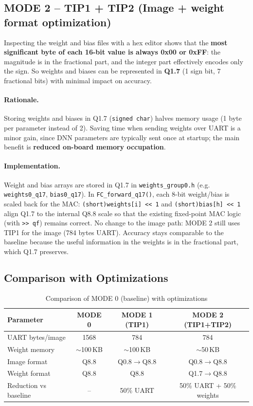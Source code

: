 \documentclass[11pt,a4paper]{article}
\begin{document}
\subsection{MODE 2 -- TIP1 + TIP2 (Image + weight format optimization)}

Inspecting the weight and bias files with a hex editor shows that the \textbf{most significant byte of each 16-bit value is always 0x00 or 0xFF}: the magnitude is in the fractional part, and the integer part effectively encodes only the sign. So weights and biases can be represented in \textbf{Q1.7} (1 sign bit, 7 fractional bits) with minimal impact on accuracy.

\paragraph{Rationale.} Storing weights and biases in Q1.7 (\texttt{signed char}) halves memory usage (1 byte per parameter instead of 2). Saving time when sending weights over UART is a minor gain, since DNN parameters are typically sent once at startup; the main benefit is \textbf{reduced on-board memory occupation}.

\paragraph{Implementation.} Weight and bias arrays are stored in Q1.7 in \texttt{weights\_group0.h} (e.g. \texttt{weights0\_q17}, \texttt{bias0\_q17}). In \texttt{FC\_forward\_q17()}, each 8-bit weight/bias is scaled back for the MAC: \texttt{(short)weights[i] << 1} and \texttt{(short)bias[h] << 1} align Q1.7 to the internal Q8.8 scale so that the existing fixed-point MAC logic (with \texttt{>> qf}) remains correct. No change to the image path: MODE 2 still uses TIP1 for the image (784 bytes UART). Accuracy stays comparable to the baseline because the useful information in the weights is in the fractional part, which Q1.7 preserves.

\subsection{Comparison with Optimizations}

\begin{table}[H]
\centering
\begin{tabular}{@{}lccc@{}}
\toprule
\textbf{Parameter} & \textbf{MODE 0} & \textbf{MODE 1 (TIP1)} & \textbf{MODE 2 (TIP1+TIP2)} \\
\midrule
UART bytes/image & 1568 & 784 & 784 \\
Weight memory & $\sim$100\,KB & $\sim$100\,KB & $\sim$50\,KB \\
Image format & Q8.8 & Q0.8$\rightarrow$Q8.8 & Q0.8$\rightarrow$Q8.8 \\
Weight format & Q8.8 & Q8.8 & Q1.7$\rightarrow$Q8.8 \\
\midrule
Reduction vs baseline & -- & 50\% UART & 50\% UART + 50\% weights \\
\bottomrule
\end{tabular}
\caption{Comparison of MODE 0 (baseline) with optimizations}
\end{table}
\end{document}
